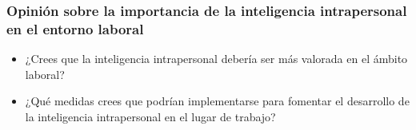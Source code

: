 \subsubsection{Opini\'on sobre la importancia de la inteligencia intrapersonal
en el entorno laboral}
\begin{itemize}
\item ¿Crees que la inteligencia intrapersonal debería ser más valorada en el ámbito laboral? 
\item ¿Qué medidas crees que podrían implementarse para fomentar el desarrollo de la inteligencia intrapersonal en el lugar de trabajo?
\end{itemize}
